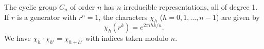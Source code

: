 The cyclic group $C_n$ of order $n$ has $n$ irreducible representations, all of degree 1.
If $r$ is a generator with $r^n = 1$, the characters $\chi_h$ ($h = 0, 1, \ldots, n-1$) are given by
$$\chi_h(r^k) = e^{2\pi i hk/n}.$$
We have $\chi_h \cdot \chi_{h'} = \chi_{h+h'}$ with indices taken modulo $n$.
